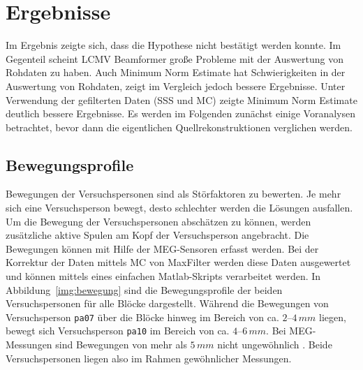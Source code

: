 \documentclass[doc,a4paper,12pt]{apa6}
\begin{document}

\section{Ergebnisse}
\label{sec:ergebnisse}

Im Ergebnis zeigte sich, dass die Hypothese nicht bestätigt werden konnte. Im Gegenteil scheint LCMV Beamformer große Probleme mit der Auswertung von Rohdaten zu haben. Auch Minimum Norm Estimate hat Schwierigkeiten in der Auswertung von Rohdaten, zeigt im Vergleich jedoch bessere Ergebnisse. Unter Verwendung der gefilterten Daten (SSS und MC) zeigte Minimum Norm Estimate deutlich bessere Ergebnisse. Es werden im Folgenden zunächst einige Voranalysen betrachtet, bevor dann die eigentlichen Quellrekonstruktionen verglichen werden.

\subsection{Bewegungsprofile}
\label{sec:bewegung}

Bewegungen der Versuchspersonen sind als Störfaktoren zu bewerten. Je mehr sich eine Versuchsperson bewegt, desto schlechter werden die Lösungen ausfallen. Um die Bewegung der Versuchspersonen abschätzen zu können, werden zusätzliche aktive Spulen am Kopf der Versuchsperson angebracht. Die Bewegungen können mit Hilfe der MEG-Sensoren erfasst werden. Bei der Korrektur der Daten mittels MC von MaxFilter werden diese Daten ausgewertet und können mittels eines einfachen Matlab-Skripts verarbeitet werden. In Abbildung~\ref{img:bewegung} sind die Bewegungsprofile der beiden Versuchspersonen für alle Blöcke dargestellt. Während die Bewegungen von Versuchsperson \texttt{pa07} über die Blöcke hinweg im Bereich von ca. $2$--$4\,mm$ liegen, bewegt sich Versuchsperson \texttt{pa10} im Bereich von ca. $4$--$6\,mm$. Bei MEG-Messungen sind Bewegungen von mehr als $5\,mm$ nicht ungewöhnlich \parencite{wilson2007continuous}. Beide Versuchspersonen liegen also im Rahmen gewöhnlicher Messungen.
\end{document}
